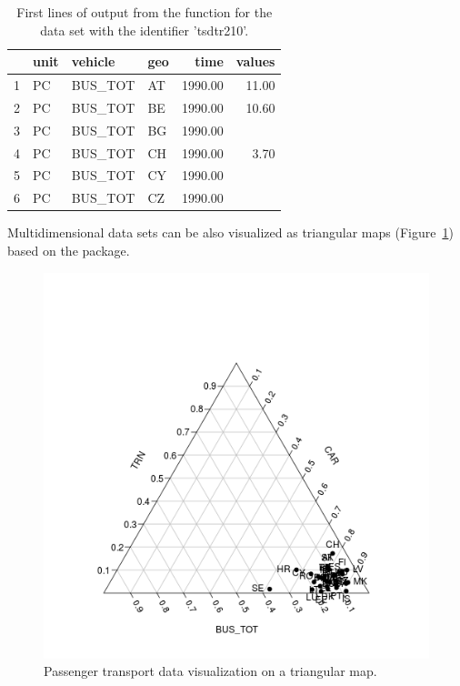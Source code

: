 \begin{table}[ht]
\centering
\begin{tabular}{rlllrr}
\toprule
  \hline
 & unit & vehicle & geo & time & values \\ 
  \hline
  1 & PC & BUS\_TOT & AT & 1990.00 & 11.00 \\ 
  2 & PC & BUS\_TOT & BE & 1990.00 & 10.60 \\ 
  3 & PC & BUS\_TOT & BG & 1990.00 &  \\ 
  4 & PC & BUS\_TOT & CH & 1990.00 & 3.70 \\ 
  5 & PC & BUS\_TOT & CY & 1990.00 &  \\ 
  6 & PC & BUS\_TOT & CZ & 1990.00 &  \\ 
   \hline
\bottomrule   
\end{tabular}
\caption{First lines of output from the  function for the data set with the identifier 'tsdtr210'.}
\label{tab:getdatatable}
\end{table}

Multidimensional data sets can be also visualized as triangular maps
(Figure~\ref{fig:plotrix}) based on
the  \citep{plotrix} package.


\begin{figure}
\begin{center}
\includegraphics{2015-manu-search2-1}
\end{center}
\caption{Passenger transport data visualization on a triangular map.}
\label{fig:plotrix}
\end{figure}


